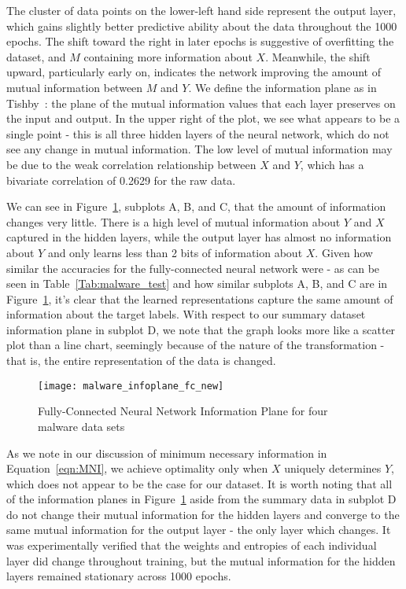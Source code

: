 The cluster of data points on the lower-left hand side represent the output layer, which gains slightly better predictive ability about the data throughout the 1000 epochs. 
The shift toward the right in later epochs is suggestive of overfitting the dataset, and $M$ containing more information about $X$.
Meanwhile, the shift upward, particularly early on, indicates the network improving the amount of mutual information between $M$ and $Y$.
We define the information plane as in Tishby~\cite{tishby2015deep}: the plane of the mutual information values that each layer preserves on the input and output.
In the upper right of the plot, we see what appears to be a single point - this is all three hidden layers of the neural network, which do not see any change in mutual information.
The low level of mutual information may be due to the weak correlation relationship between $X$ and $Y$, which has a bivariate correlation of 0.2629 for the raw data.

We can see in Figure~\ref{fig:malware infoplane fc}, subplots A, B, and C, that the amount of information changes very little. There is a high level of mutual information about $Y$ and $X$ captured in the hidden layers, while the output layer has almost no information about $Y$ and only learns less than 2 bits of information about $X$.
Given how similar the accuracies for the fully-connected neural network were - as can be seen in Table~\ref{Tab:malware_test} and how similar subplots A, B, and C are in Figure~\ref{fig:malware infoplane fc}, it's clear that the learned representations capture the same amount of information about the target labels.
With respect to our summary dataset information plane in subplot D, we note that the graph looks more like a scatter plot than a line chart, seemingly because of the nature of the transformation - that is, the entire representation of the data is changed. 

\begin{figure}[h]
\begin{center}
\texttt{[image: malware\_infoplane\_fc\_new]}
\caption{Fully-Connected Neural Network Information Plane for four malware data sets}
\label{fig:malware infoplane fc}
\centering
\end{center}
\end{figure}

As we note in our discussion of minimum necessary information in Equation~\ref{eqn:MNI}, we achieve optimality only when $X$ uniquely determines $Y$, which does not appear to be the case for our dataset. 
It is worth noting that all of the information planes in Figure~\ref{fig:malware infoplane fc} aside from the summary data in subplot D do not change their mutual information for the hidden layers and converge to the same mutual information for the output layer - the only layer which changes.
It was experimentally verified that the weights and entropies of each individual layer did change throughout training, but the mutual information for the hidden layers remained stationary across 1000 epochs.

